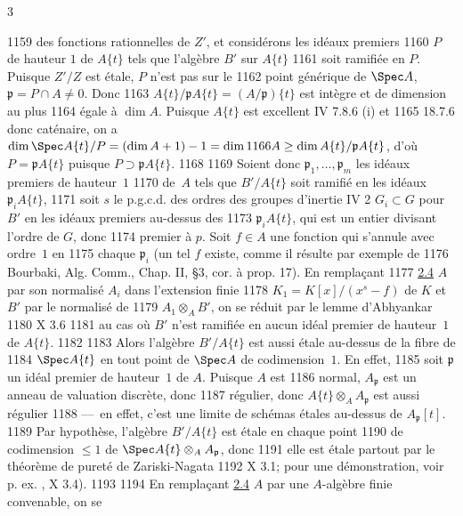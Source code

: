 3	\documentclass[10pt]{../fichiers-configuration-latex/smfart}
\begin{document}
  1159	des fonctions rationnelles de $Z'$, et considérons les idéaux premiers
  1160	$P$ de hauteur $1$ de $A\{t\}$ tels que l'algèbre $B'$ sur $A\{t\}$
  1161	soit ramifiée en $P$. Puisque $Z'/Z$ est étale, $P$ n'est pas sur le
  1162	point générique de $\Spec A$, \ie $\mathfrak{p}=P\cap A\neq 0$. Donc
  1163	$A\{t\}/\mathfrak{p}A\{t\}=(A/\mathfrak{p})\{t\}$ est intègre et de dimension au plus
  1164	égale à $\dim A$. Puisque $A\{t\}$ est excellent \sisi{(}{}\EGA IV 7.8.6 (i) et
  1165	18.7.6\sisi{)}{} donc caténaire, on a $\dim \Spec A\{t\}/P=(\dim A+1)-1=\dim
  1166	A\geq \dim A\{t\}/\mathfrak{p}A\{t\}$, d'où	$P=\mathfrak{p}A\{t\}$ puisque $P\supset \mathfrak{p}A\{t\}$.
  1168	
  1169	Soient donc $\mathfrak{p}_1,\ldots,\mathfrak{p}_m$ les idéaux premiers de hauteur~$1$
  1170	de~$A$ tels que $B'/A\{t\}$ soit ramifié en les idéaux $\mathfrak{p}_iA\{t\}$,
  1171	soit $s$ le p.g.c.d. des ordres des groupes d'inertie \sisi{(}{}	IV 2\sisi{)}{} $G_{i}\subset G$ pour $B'$ en les idéaux premiers au-dessus des
  1173	$\mathfrak{p}_{i}A\{t\}$, qui est un entier divisant l'ordre de $G$, donc
  1174	premier à $p$. Soit $f\in A$ une fonction qui s'annule avec ordre~$1$ en
  1175	chaque $\mathfrak{p}_i$ (un tel $f$ existe, comme il résulte par exemple de
  1176	Bourbaki, Alg. Comm., Chap. II, \S 3, cor. à prop. 17). En remplaçant
  1177	\sisi{(}{}\hyperref[XV.cor2.4]{2.4}\sisi{)}{} $A$ par son normalisé $A_i$ dans l'extension finie
  1178	$K_{1}=K[x]/(x^{s}-f)$ de $K$ et $B'$ par le normalisé de
  1179	$A_{1}\otimes_A B'$, on se réduit par le lemme d'Abhyankar
  1180	\sisi{(}{} X 3.6\sisi{)}{}
  1181	au cas où $B'$ n'est ramifiée en aucun idéal premier de hauteur~$1$ de $A\{t\}$.
  1182	
  1183	Alors l'algèbre $B'/A\{t\}$ est aussi étale au-dessus de la fibre de
  1184	$\Spec A\{t\}$ en tout point de $\Spec A$ de codimension~$1$. En effet,
  1185	soit $\mathfrak{p}$ un idéal premier de hauteur~$1$ de $A$. Puisque $A$ est
  1186	normal, $A_{\mathfrak{p}}$ est un anneau de valuation discrète, donc
  1187	régulier, donc $A\{t\}\otimes_A A_{\mathfrak{p}}$ est aussi régulier
  1188	---~en effet, c'est une limite de schémas étales au-dessus de $A_{\mathfrak{p}}[t]$.
  1189	Par hypothèse, l'algèbre $B'/A\{t\}$ est étale en chaque point
  1190	de codimension $\leq 1$ de $\Spec A\{t\}\otimes_A A_{\mathfrak{p}}$, donc
  1191	elle est étale partout par le théorème de pureté de Zariski-Nagata
  1192	\sisi{(}{} X 3.1\sisi{)}{}; pour une démonstration, voir p. ex. , X 3.4).
  1193	
  1194	En remplaçant \sisi{(}{}\hyperref[XV.cor2.4]{2.4}\sisi{)}{} $A$ par une $A$-algèbre finie convenable, on se
\end{document}
